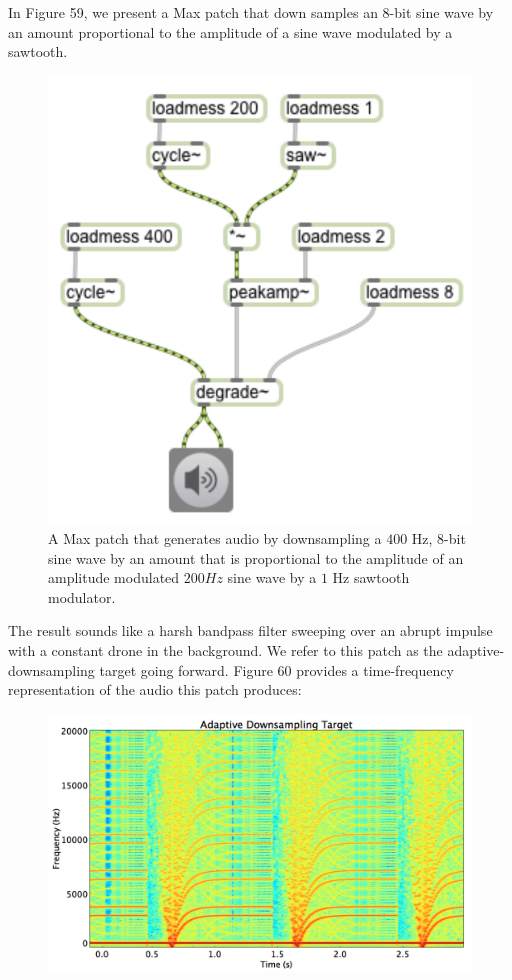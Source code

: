 \documentclass[12pt]{report} 	%
\numberwithin{figure}{chapter}
\numberwithin{table}{chapter}
\numberwithin{equation}{chapter}
\begin{document}
\begin{flushleft}
In Figure 59, we present a Max patch that down samples an 8-bit sine wave by an amount proportional to the amplitude of a sine wave modulated by a sawtooth. 
\begin{figure}[h!]
\begin{center}
\includegraphics[scale=0.8]{AdaptiveDegrade}
\caption[Adaptive downsampling Max patch]{A Max patch that generates audio by downsampling a $400$ Hz, $8$-bit sine wave by an amount that is proportional to the amplitude of an amplitude modulated $200 Hz$ sine wave by a $1$ Hz sawtooth modulator.}
\end{center}
\vspace{6pt}
\end{figure}
The result sounds like a harsh bandpass filter sweeping over an abrupt impulse with a constant drone in the background. We refer to this patch as the adaptive-downsampling target going forward. Figure 60 provides a time-frequency representation of the audio this patch produces:
\begin{figure}[h!]
\begin{center}
\includegraphics[width=\linewidth]{AdaptiveDownsamplingTargetSTFT}

\end{center}
\end{figure}
\end{flushleft}
\end{document}
